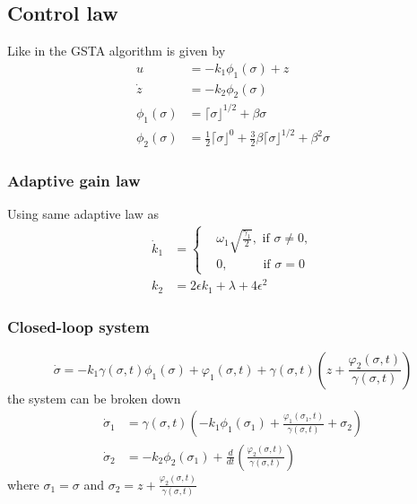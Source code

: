 \subsection{Control law}
Like in \cite{Cas:18} the GSTA algorithm is given by
\begin{equation}
    \begin{split}
        u &= -k_1 \phi_1(\sigma) + z \\ 
        \dot{z} &= -k_2\phi_2(\sigma) \\
        \phi_1(\sigma) &= \lceil \sigma \rfloor^{1/2} + \beta \sigma \\
        \phi_2(\sigma) &= \frac{1}{2} \lceil \sigma \rfloor^0 + \frac{3}{2}\beta\lceil \sigma \rfloor^{1/2} + \beta^2\sigma  
    \end{split}
\end{equation}

\subsubsection{Adaptive gain law}
Using same adaptive law as \cite{Sht:10}
\begin{equation}
    \begin{split}
    \dot{k}_1 &= 
    \begin{cases}
        &\omega_1 \sqrt{\frac{\gamma_1}{2}}, \text{ if } \sigma \neq 0, \\
        &0, \qquad\ \ \text{ if } \sigma = 0
    \end{cases} \\
    k_2 &= 2\epsilon k_1 + \lambda + 4\epsilon^2
    \end{split}
    \label{eq:borlaug-adaptive-law}
\end{equation}

\subsubsection{Closed-loop system}
    \begin{equation}
        \dot{\sigma} = -k_1\gamma(\sigma, t)\phi_1(\sigma) + \varphi_1(\sigma, t) + \gamma(\sigma, t)\left(z + \frac{\varphi_2(\sigma, t)}{\gamma(\sigma, t)}\right)
    \end{equation}
    the system can be broken down
    \begin{equation}
        \begin{split}
        \dot{\sigma}_1 &= \gamma(\sigma, t)\left(-k_1\phi_1(\sigma_1) + \frac{\varphi_1(\sigma_1,t)}{\gamma(\sigma, t)} + \sigma_2\right)\\
        \dot{\sigma}_2 &= -k_2\phi_2(\sigma_1)+ \frac{d}{dt}\left(\frac{\varphi_2(\sigma, t)}{\gamma(\sigma, t)}\right)
        \end{split}
        \label{eq:borlaug-closed-loop}
    \end{equation}
    where $\sigma_1 = \sigma$ and $\sigma_2 = z + \frac{\varphi_2(\sigma, t)}{\gamma(\sigma, t)}$

